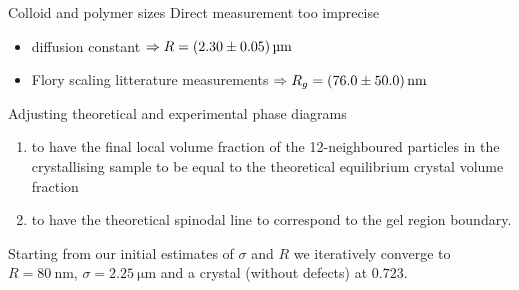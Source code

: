\documentclass[xcolor=table]{beamer}
\begin{document}
\begin{frame}{Colloid and polymer sizes}
	Direct measurement \alert{too imprecise}
	\begin{itemize}
	\item diffusion constant $\Rightarrow R= \SI{2.3 +- 0.05}{\micro\metre}$
	\item Flory scaling litterature measurements $\Rightarrow R_g=\SI{76. +- 50.}{\nano\metre}$
	\end{itemize}
	
	\begin{block}{Adjusting theoretical and experimental phase diagrams}
	\begin{enumerate}
	\item to have the final local volume fraction of the 12-neighboured particles in the crystallising sample to be equal to the theoretical equilibrium crystal volume fraction 
	\item to have the theoretical spinodal line to correspond to the gel region boundary.
	\end{enumerate}
	\end{block}
	Starting from our initial estimates of $\sigma$ and $R$ we iteratively converge to $R=\SI{80}{\nano\metre}$, $\sigma = \SI{2.25}{\micro\metre}$ and a crystal (without defects) at $0.723$.
\end{frame}
\end{document}
